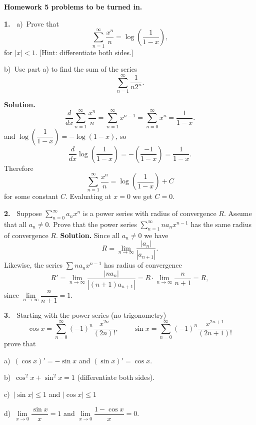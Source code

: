 \documentclass[12pt]{article}
\theoremstyle{definition}
\theoremstyle{remark}
\theoremstyle{definition}
\newenvironment{Solution}{\noindent\textbf{Solution.}}{}
\begin{document}
\newpage

{\bf Homework 5 problems to be turned in.}

{\bf 1.\ } a)\ Prove that 
\[
\sum_{n=1}^\infty\frac{x^n}{n}=\log\left(\frac{1}{1-x}\right), 
\]
for $|x|<1$. 
[Hint: differentiate both sides.]

b)\ Use part a) to find the sum of the series
\[\sum_{n=1}^\infty \frac{1}{n2^n}.\]

\begin{Solution}
\[\frac{d}{dx}\sum_{n=1}^\infty\frac{x^n}{n}=\sum_{n=1}^\infty x^{n-1}=
\sum_{n=0}^\infty x^n=\frac{1}{1-x}. 
\]
and $\log\left(\dfrac{1}{1-x}\right)=-\log(1-x)$, so 
\[\frac{d}{dx}\log\left(\frac{1}{1-x}\right)=-\left(\frac{-1}{1-x}\right)=\frac{1}{1-x}.\] 
Therefore 
\[
\sum_{n=1}^\infty\frac{x^n}{n}=\log\left(\frac{1}{1-x}\right)+C 
\]
for some constant $C$. Evaluating at $x=0$ we get $C=0$. 
\end{Solution}

{\bf 2.\ } Suppose $\sum_{n=0}^\infty a_nx^n$ is a power series with radius of convergence $R$. Assume that all $a_n\neq 0$. Prove that the power series $\sum\limits_{n=1}^\infty na_nx^{n-1}$  has the same radius of convergence $R$.
\begin{Solution}
Since all $a_n\neq 0$ we have 
\[R=\lim_{n\to\infty}\frac{|a_n|}{|a_{n+1}|}.\]
Likewise, the series $\sum n a_n x^{n-1}$ has radius of convergence 
\[R'=\lim_{n\to\infty}\frac{|na_n|}{|(n+1)a_{n+1}|}
=R\cdot \lim_{n\to\infty}\frac{n}{n+1}=R,
\]
since  $\lim\limits_{n\to\infty}\dfrac{n}{n+1}=1$. 
\end{Solution}

{\bf 3.\ } Starting with the power series (no trigonometry)
\[\cos x=\sum_{n=0}^\infty (-1)^n\frac{x^{2n}}{(2n)!},\qquad 
\sin x=\sum_{n=0}^\infty (-1)^n\frac{x^{2n+1}}{(2n+1)!}
\]
prove that 

a)\ $(\cos x)'=-\sin x$ and $(\sin x)'=\cos x$.

b)\ $\cos^2x+\sin^2 x=1$ (differentiate both sides). 

c)\ $|\sin x|\leq 1$ and $|\cos x|\leq 1$

d)\ $\lim\limits_{x\to 0}\dfrac{\sin x}{x}=1$ and $\lim\limits_{x\to 0}\dfrac{1-\cos x}{x}=0$. 
\end{document}
